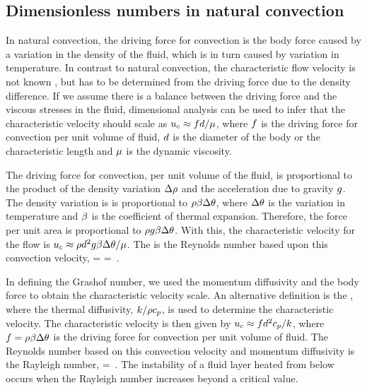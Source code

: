 \subsection{Dimensionless numbers in natural convection}
In natural convection, the driving force for convection is the body force caused by a variation in the density of the fluid, which is in turn caused by variation in temperature. In contrast to natural convection, the characteristic flow velocity is not known \apriori, but has to be determined from the driving force due to the density difference. If we assume there is a balance between the driving force and the viscous stresses in the fluid, dimensional analysis can be used to infer that the characteristic velocity should scale as ${u}_{c}\approx fd/\mu$, where $f$ is the driving force for convection per unit volume of fluid, $d$ is the diameter of the body or the characteristic length and $\mu$ is the dynamic viscosity.

The driving force for convection, per unit volume of the fluid, is proportional to the product of the density variation $\Delta\rho$ and the acceleration due to gravity $g$. The density variation is is proportional to $\rho\beta\Delta\theta$, where $\Delta\theta$ is the variation in temperature and $\beta$ is the coefficient of thermal expansion. Therefore, the force per unit area is proportional to $\rho g\beta\Delta\theta$. With this, the characteristic velocity for the flow is ${u}_{c}\approx\rho d^2g\beta\Delta\theta/\mu$. The  is the Reynolds number based upon this convection velocity,
\beq
\kgrashof = \dfrac{\dens\chpq\vel\diam}{\dynvis} 
          = \,.
\eeq

In defining the Grashof number, we used the momentum diffusivity and the body force to obtain the characteristic velocity scale. An alternative definition is the , where the thermal diffusivity, $k/\rho c_p$, is used to determine the characteristic velocity. The characteristic velocity is then given by ${u}_{c}\approx fd^2c_p/k$, where $f = \rho\beta\Delta\theta$ is the driving force for convection per unit volume of fluid. The Reynolds number based on this convection velocity and momentum diffusivity is the Rayleigh number,
\beq
\krayleigh = \dfrac{\dens^2\kshcap_\press\diam^3\grav\kthexp\Dx\temp}{\dynvis\kthcond}\,.
\eeq
The  instability of a fluid layer heated from below occurs when the Rayleigh number increases beyond a critical value.


